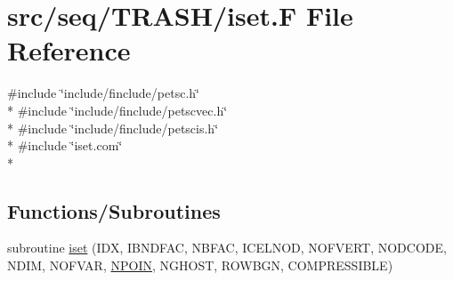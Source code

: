 \hypertarget{seq_2_t_r_a_s_h_2iset_8_f}{\section{src/seq/\-T\-R\-A\-S\-H/iset.F File Reference}
\label{seq_2_t_r_a_s_h_2iset_8_f}
}
{\ttfamily \#include \char`\"{}include/finclude/petsc.\-h\char`\"{}}\\*
{\ttfamily \#include \char`\"{}include/finclude/petscvec.\-h\char`\"{}}\\*
{\ttfamily \#include \char`\"{}include/finclude/petscis.\-h\char`\"{}}\\*
{\ttfamily \#include \char`\"{}iset.\-com\char`\"{}}\\*
\subsection*{Functions/\-Subroutines}
\begin{DoxyCompactItemize}
\item 
subroutine \hyperlink{seq_2_t_r_a_s_h_2iset_8_f_a6b328a7eb83f097f120c99838f8aa646}{iset} (I\-D\-X, I\-B\-N\-D\-F\-A\-C, N\-B\-F\-A\-C, I\-C\-E\-L\-N\-O\-D, N\-O\-F\-V\-E\-R\-T, N\-O\-D\-C\-O\-D\-E, N\-D\-I\-M, N\-O\-F\-V\-A\-R, \hyperlink{mesh_8com_ae28c1572321efcd8715b974d87d20c58}{N\-P\-O\-I\-N}, N\-G\-H\-O\-S\-T, R\-O\-W\-B\-G\-N, C\-O\-M\-P\-R\-E\-S\-S\-I\-B\-L\-E)
\end{DoxyCompactItemize}


